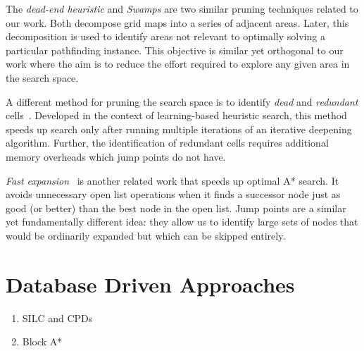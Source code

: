 The \emph{dead-end heuristic} \cite{bjornsson06} and \emph{Swamps} \cite{pochter10}
are two similar pruning techniques related to our work.
Both decompose grid maps into a series of adjacent areas. Later, this decomposition
is used to identify areas not relevant to optimally solving a particular
pathfinding instance.
This objective is similar yet orthogonal to our work where
the aim is to reduce the effort required to explore any given area in the search
space.

A different method for pruning the search space is to identify \emph{dead} and
\emph{redundant} cells~\cite{sturtevant10b}.  Developed in the context of
learning-based heuristic search, this method speeds up search only after running
multiple iterations of an iterative deepening algorithm.  Further, the
identification of redundant cells requires additional memory overheads which
jump points do not have.

\emph{Fast expansion}~\cite{sun09} is another related work that speeds up
optimal A* search. It avoids unnecessary open list operations when it finds a
successor node just as good (or better) than the best node in the open list.
Jump points are a similar yet fundamentally different idea: they allow us to
identify large sets of nodes that would be ordinarily expanded but which can be
skipped entirely.

\section{Database Driven Approaches}
\label{cha::lit::enhancements::db}

\begin{enumerate}
\item{SILC and CPDs}
\item{Block A*}
\end{enumerate}

